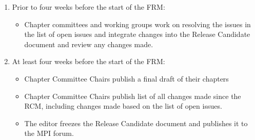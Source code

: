{{\begin{enumerate}
\begin{enumerate}
  \item The MPI Forum collectively reviews the entire Release
    Candidate Draft MPI Standard Document, looking for problems such
    as:
    \begin{itemize}
    \item Formatting and whitespace problems, spelling errors, and
      other typos.  Such problems should be itemized and can be fixed
      at the meeting by Chapter Committees and/or the MPI Standard
      Document Editor.
    \item Logical inconsistencies in the overall document, or problems
      with approved changes.
    \end{itemize}

  \item The MPI Forum compiles a list of all still-unresolved issues
    that will be fixed before this release of the MPI Standard
    Document.
    \begin{itemize}
    \item Forum members are encouraged to only allow
      ``errata''-quality items on the list of still-unresolved
      issues.  Larger items should either delay the ratification
      process or be deferred to a future version of the MPI Standard
      Document.
    \end{itemize}

  \item Per section~\ref{subsec:general-text-proposals}, a first
    ballot is conducted on ratifying the entire Release Candidate
    Draft MPI Standard Document {\em along with} the listing of all
    still-unresolved issues created in the previous step.
    \begin{itemize}
    \item If the ballot fails, the entire procedure must be repeated, possibly starting a new RCM at the next physical meeting.
    \end{itemize}
  \end{enumerate}

\item Prior to four weeks before the start of the FRM:
  \begin{itemize}
  \item Chapter committees and working groups work on resolving the issues in the list of open issues and integrate changes into the Release Candidate document and review any changes made.
  \end{itemize}

\item At least four weeks before the start of the FRM:
  \begin{itemize}
  \item Chapter Committee Chairs publish a final draft of their chapters
  \item Chapter Committee Chairs publish list of all changes made since the RCM, including changes made based on the list of open issues.
  \item The editor freezes the Release Candidate document and publishes it to the MPI forum.
  \end{itemize}


\end{enumerate}}}

